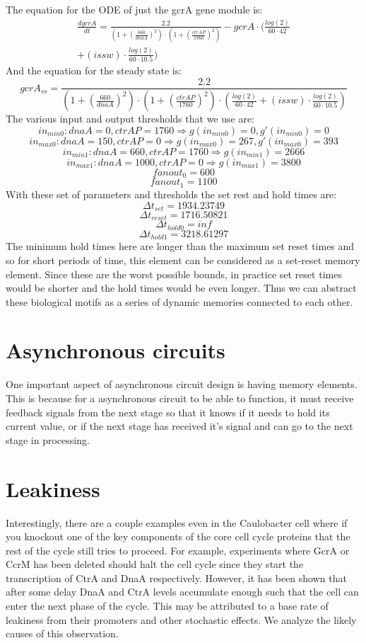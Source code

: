 \documentclass{article}
\begin{document}
The equation for the ODE of just the gcrA gene module is:
\[
\begin{split}
\frac{d gcrA}{d t}=\frac{2.2}{(1+(\frac{660}{dnaA})^2)\cdot (1+(\frac{ctrAP}{1760})^2)}-gcrA\cdot (\frac{log(2)}{60\cdot 42} \\
+(issw)\cdot \frac{log(2)}{60\cdot 10.5})
\end{split}
\]
And the equation for the steady state is:
\[gcrA_{ss}=\frac{2.2}{(1+(\frac{660}{dnaA})^2)\cdot (1+(\frac{ctrAP}{1760})^2)\cdot (\frac{log(2)}{60\cdot 42}
+(issw)\cdot \frac{log(2)}{60\cdot 10.5})}
\]
The various input and output thresholds that we use are:
\[in_{min0}: dnaA=0, ctrAP=1760  \Rightarrow g(in_{min0})=0, g'(in_{min0})=0
\]
\[in_{max0}: dnaA=150, ctrAP=0  \Rightarrow g(in_{max0})=267, g'(in_{max0})=393
\]
\[in_{min1}: dnaA=660, ctrAP=1760  \Rightarrow g(in_{min1})=2666 %
\]
\[in_{max1}: dnaA=1000, ctrAP=0  \Rightarrow g(in_{max1})=3800
\]
\[fanout_0=600
\]
\[fanout_1=1100
\]
With these set of parameters and thresholds the set rest and hold times are:
\[\Delta t_{set}=1934.23749
\]
\[\Delta t_{reset}=1716.50821
\]
\[\Delta t_{hold0}= inf
\]
\[\Delta t_{hold1}=3218.61297
\]
The minimum hold times here are longer than the maximum set reset times and so for short periods of time, this element can be considered as a set-reset memory element.  Since these are the worst possible bounds, in practice set reset times would be shorter and the hold times would be even longer.  Thus we can abstract these biological motifs as a series of dynamic memories connected to each other.

\section{Asynchronous circuits}
One important aspect of asynchronous circuit design is having memory elements.  This is because for a asynchronous circuit to be able to function, it must receive feedback signals from the next stage so that it knows if it needs to hold its current value, or if the next stage has received it's signal and can go to the next stage in processing.

\section{Leakiness}
Interestingly, there are a couple examples even in the Caulobacter cell where if you knockout one of the key components of the core cell cycle proteins that the rest of the cycle still tries to proceed.  For example, experiments where GcrA or CcrM has been deleted should halt the cell cycle since they start the transcription of CtrA and DnaA respectively.  However, it has been shown that after some delay DnaA and CtrA levels accumulate enough such that the cell can enter the next phase of the cycle.  This may be attributed to a base rate of leakiness from their promoters and other stochastic effects.  We analyze the likely causes of this observation.
\end{document}
